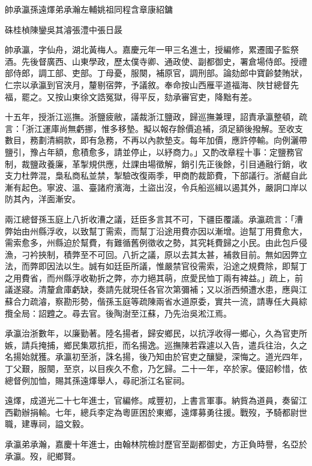 
\begin{pinyinscope}
帥承瀛孫遠燡弟承瀚左輔姚祖同程含章康紹鏞

硃桂楨陳鑾吳其濬張澧中張日晸

帥承瀛，字仙舟，湖北黃梅人。嘉慶元年一甲三名進士，授編修，累遷國子監祭酒。先後督廣西、山東學政，歷太僕寺卿、通政使、副都御史，署倉場侍郎。授禮部侍郎，調工部、吏部。丁母憂，服闋，補原官，調刑部。論劾郎中寶齡婪賄狀，仁宗以承瀛到官浹月，釐剔宿弊，予議敘。奉命按山西雁平道福海、陜甘總督先福，罷之。又按山東徐文誥冤獄，得平反，劾承審官吏，降黜有差。

十五年，授浙江巡撫。浙鹽疲敝，議裁浙江鹽政，歸巡撫兼理，詔責承瀛整頓，疏言：「浙江運庫尚無虧挪，惟多移墊。擬以報存餘價追補，須足額後撥解。至收支數目，務劃清綱款，即有急務，不再以內款墊支。每年加價，應許停輸。向例灑帶鹽引，豫占年額，愈積愈多，請並停止，以紓商力。」又酌改章程十事：定鹽務官制，裁鹽政養廉，革掣規供應，灶課由場徵解，銷引先正後餘，引目通融行銷，收支力杜弊混，梟私商私並禁，掣驗改復兩季，甲商酌裁節費，下部議行。浙鹺自此漸有起色。寧波、溫、臺諸府濱海，土盜出沒，令兵船巡緝以遏其外，嚴詗口岸以防其內，洋面漸安。

兩江總督孫玉庭上八折收漕之議，廷臣多言其不可，下疆臣覆議。承瀛疏言：「漕弊始由州縣浮收，以致幫丁需索，而幫丁沿途用費亦因以漸增。迨幫丁用費愈大，需索愈多，州縣迫於幫費，有難循舊例徵收之勢，其究耗費歸之小民。由此包戶侵漁，刁衿挾制，積弊至不可回。八折之議，原以去其太甚，補救目前。無如因弊立法，而弊即因法以生。誠有如廷臣所議，惟嚴禁官役需索，沿途之規費除，即幫丁之用費省，而州縣浮收勒折之弊，亦力絕其萌，庶愛民恤丁兩有裨益。」疏上，前議遂寢。清釐倉庫虧缺，奏請先就現任各官次第彌補；又以浙西頻遭水患，應與江蘇合力疏濬，察勘形勢，偕孫玉庭等疏陳兩省水道原委，實共一流，請專任大員綜攬全局：詔韙之。尋去官。後陶澍至江蘇，乃先治吳淞江焉。

承瀛治浙數年，以廉勤著。陸名揚者，歸安鄉民，以抗浮收得一鄉心，久為官吏所嫉，請兵掩捕，鄉民集眾抗拒，而名揚逸。巡撫陳若霖遽以入告，遣兵往治，久之名揚始就獲。承瀛初至浙，誅名揚，後乃知由於官吏之釀變，深悔之。道光四年，丁父艱，服闋，至京，以目疾久不愈，乃乞歸。二十一年，卒於家。優詔軫惜，依總督例加恤，賜其孫遠燡舉人，尋祀浙江名宦祠。

遠燡，成道光二十七年進士，官編修。咸豐初，上書言軍事。納貲為道員，奏留江西勸辦捐輸。七年，總兵李定為粵匪困於東鄉，遠燡募勇往援。戰歿，予騎都尉世職，建專祠，謚文毅。

承瀛弟承瀚，嘉慶十年進士，由翰林院檢討歷官至副都御史，方正負時譽，名亞於承瀛。歿，祀鄉賢。


\end{pinyinscope}
